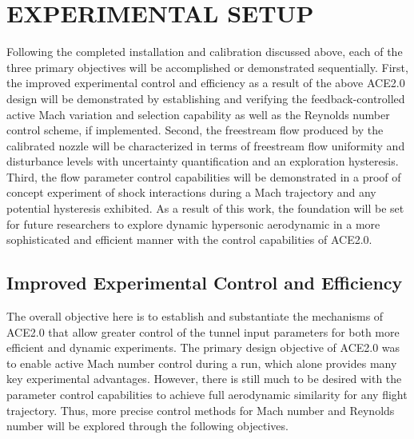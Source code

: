 %
%  
%


\chapter{EXPERIMENTAL SETUP}

Following the completed installation and calibration discussed above, each of the three primary objectives will be accomplished or demonstrated sequentially. First, the improved experimental control and efficiency as a result of the above ACE2.0 design will be demonstrated by establishing and verifying the feedback-controlled active Mach variation and selection capability as well as the Reynolds number control scheme, if implemented. Second, the freestream flow produced by the calibrated nozzle will be characterized in terms of freestream flow uniformity and disturbance levels with uncertainty quantification and an exploration hysteresis. Third, the flow parameter control capabilities will be demonstrated in a proof of concept experiment of shock interactions during a Mach trajectory and any potential hysteresis exhibited. As a result of this work, the foundation will be set for future researchers to explore dynamic hypersonic aerodynamic in a more sophisticated and efficient manner with the control capabilities of ACE2.0.

\section{Improved Experimental Control and Efficiency} 

The overall objective here is to establish and substantiate the mechanisms of ACE2.0 that allow greater control of the tunnel input parameters for both more efficient and dynamic experiments. The primary design objective of ACE2.0 was to enable active Mach number control during a run, which alone provides many key experimental advantages. However, there is still much to be desired with the parameter control capabilities to achieve full aerodynamic similarity for any flight trajectory. Thus, more precise control methods for Mach number and Reynolds number will be explored through the following objectives.

